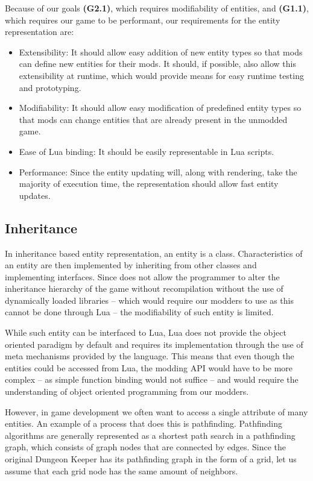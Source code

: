 Because of our goals \textbf{(G2.1)}, which requires modifiability of entities, and \textbf{(G1.1)}, which requires our game to be
performant, our requirements for the entity representation are:

\begin{itemize}
    \item Extensibility: It should allow easy addition of new entity types so that mods can define new entities for their mods. It
        should, if possible, also allow this extensibility at runtime, which would provide means for easy runtime testing and prototyping.
    \item Modifiability: It should allow easy modification of predefined entity types so that mods can change entities that are already
        present in the unmodded game.
    \item Ease of Lua binding: It should be easily representable in Lua scripts.
    \item Performance: Since the entity updating will, along with rendering, take the majority of execution time, the representation should
        allow fast entity updates.
\end{itemize}

\subsection{Inheritance}

In inheritance based entity representation, an entity is a class. Characteristics of an entity are then implemented by inheriting
from other classes and implementing interfaces. Since \cpp does not allow the programmer to alter the inheritance hierarchy of the game
without recompilation without the use of dynamically loaded libraries -- which would require our modders to use \cpp as this cannot
be done through Lua -- the modifiability of such entity is limited.

While such entity can be interfaced to Lua, Lua does not provide the object oriented paradigm by default and requires its implementation
through the use of meta mechanisms provided by the language. This means that even though the entities could be accessed from Lua, the
modding API would have to be more complex -- as simple function binding would not suffice -- and would require the understanding
of object oriented programming from our modders.

However, in game development we often want to access a single attribute of many entities. An example of a process that does this is
pathfinding. Pathfinding algorithms are generally represented as a shortest path search in a pathfinding graph, which consists of
graph nodes that are connected by edges. Since the original Dungeon Keeper has its pathfinding graph in the form of a grid, let us
assume that each grid node has the same amount of neighbors.

